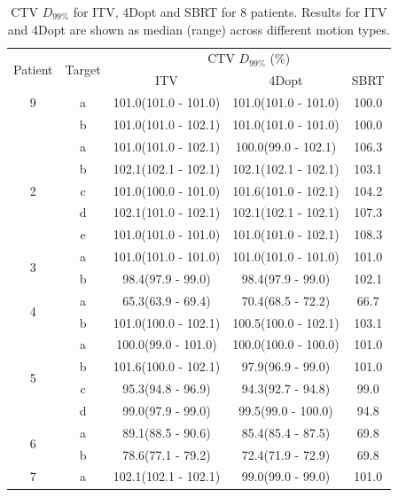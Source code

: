 \documentclass[type=dr, dr=rernat, accentcolor=tud7b,colorbacktitle, bigchapter, openright, twoside, 12pt ]{tudthesis}
\begin{document}

\begin{table}[H]
	\centering
	\caption{CTV $D_{99\%}$ for ITV, 4Dopt and SBRT for 8 patients. Results for ITV and 4Dopt are shown as median (range) across different motion types.}
	\begin{tabular}{c|c|c|c|c}
		\hline\hline
		\multirow{2}{*}{Patient} & \multirow{2}{*}{Target} & \multicolumn{3}{|c}{CTV $D_{99\%}$ (\%)}  \\
		 &  & ITV & 4Dopt & SBRT \\
		 \hline9
		 
\multirow{2}{*}{1} & a & 101.0(101.0 - 101.0) & 101.0(101.0 - 101.0) & 100.0\\ 
 & b & 101.0(101.0 - 102.1) & 101.0(101.0 - 101.0) & 100.0\\ 
 \hline
\multirow{5}{*}{2} & a & 101.0(101.0 - 102.1) & 100.0(99.0 - 102.1) & 106.3\\ 
 & b & 102.1(102.1 - 102.1) & 102.1(102.1 - 102.1) & 103.1\\ 
 & c & 101.0(100.0 - 101.0) & 101.6(101.0 - 102.1) & 104.2\\ 
 & d & 102.1(101.0 - 102.1) & 102.1(102.1 - 102.1) & 107.3\\ 
 & e & 101.0(101.0 - 101.0) & 101.0(101.0 - 102.1) & 108.3\\ 
 \hline
\multirow{2}{*}{3} & a & 101.0(101.0 - 101.0) & 101.0(101.0 - 101.0) & 101.0\\ 
 & b & 98.4(97.9 - 99.0) & 98.4(97.9 - 99.0) & 102.1\\ 
 \hline
\multirow{2}{*}{4} & a & 65.3(63.9 - 69.4) & 70.4(68.5 - 72.2) & 66.7\\ 
 & b & 101.0(100.0 - 102.1) & 100.5(100.0 - 102.1) & 103.1\\ 
 \hline
\multirow{4}{*}{5} & a & 100.0(99.0 - 101.0) & 100.0(100.0 - 100.0) & 101.0\\ 
 & b & 101.6(100.0 - 102.1) & 97.9(96.9 - 99.0) & 101.0\\ 
 & c & 95.3(94.8 - 96.9) & 94.3(92.7 - 94.8) & 99.0\\ 
 & d & 99.0(97.9 - 99.0) & 99.5(99.0 - 100.0) & 94.8\\ 
 \hline
\multirow{2}{*}{6} & a & 89.1(88.5 - 90.6) & 85.4(85.4 - 87.5) & 69.8\\ 
 & b & 78.6(77.1 - 79.2) & 72.4(71.9 - 72.9) & 69.8\\ 
 \hline
\multirow{2}{*}{7} & a & 102.1(102.1 - 102.1) & 99.0(99.0 - 99.0) & 101.0\\ 

\end{tabular}
\end{table}
\end{document}
